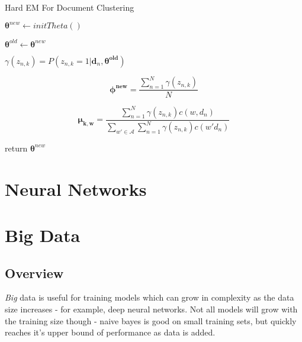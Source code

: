 \documentclass[a4paper]{article}
\begin{document}
	\begin{algorithm}
		\caption{Hard EM For Document Clustering}
		\begin{algorithmic}[1]
			
			\State $\mathbf{\theta}^{new} \gets initTheta()$ 
			
			\Do
			\State $\mathbf{\theta}^{old} \gets \mathbf{\theta}^{new}$
			
			
			
			\State $\gamma(z_{n,k}) = P(z_{n,k} = 1 | \mathbf{d}_n, \mathbf{\theta^{old}})$ 
			
			\State $$\mathbf{\phi^{new}} = \frac{\sum^{N}_{n=1}\gamma(z_{n,k})}{N}$$
			
			\State $$\mathbf{\mu_{k,w}} = 
			\frac
			{\sum^{N}_{n=1}\gamma(z_{n,k})c(w, d_n)} {\sum_{w' \in \mathcal{A}} \sum^{N}_{n=1} \gamma(z_{n,k})c(w' d_n)}$$ 
			
			\EndFor
			
			\EndFor
			
			
			\State return {$\mathbf{\theta}^{new}$}
			
			\EndProcedure
		\end{algorithmic}
	\end{algorithm}
	
	\clearpage
	\section{Neural Networks}
	
	\clearpage
	\section{Big Data}
	
	\subsection{Overview}
	
	\textit{Big} data is useful for training models which can grow in complexity as the data size increases - for example, deep neural networks. Not all models will grow with the training size though - naive bayes is good on small training sets, but quickly reaches it's upper bound of performance as data is added. \\
	
\end{document}
